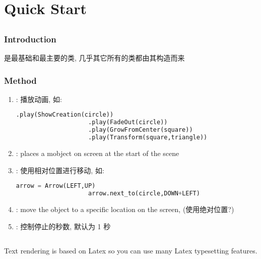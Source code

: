 \chapter{Quick Start}
\section{}
    \subsection{Introduction}
        \hspace*{2em} 是最基础和最主要的类, 几乎其它所有的类都由其构造而来

    \subsection{Method}
        \begin{enumerate}
            \item {}: 播放动画, 如:
                \begin{lstlisting}[language=Python, gobble=20]
                    .play(ShowCreation(circle))
                    .play(FadeOut(circle))
                    .play(GrowFromCenter(square))
                    .play(Transform(square,triangle))
                \end{lstlisting}
            \item {}: places a mobject on screen at the start of the scene
            \item {}: 使用相对位置进行移动, 如:
                \begin{lstlisting}[language = {Python}, gobble = 20]
                    arrow = Arrow(LEFT,UP)
                    arrow.next_to(circle,DOWN+LEFT)
                \end{lstlisting}
            \item {}: move the object to a specific location on the screen, (使用绝对位置?)
            \item {}: 控制停止的秒数, 默认为 1 秒
        \end{enumerate}
        
\section{}
    \subsection{}
        \hspace*{2em}Text rendering is based on Latex so you can use many Latex typesetting features.

